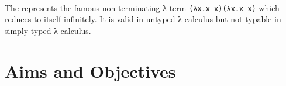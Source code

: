 \begin{code}%
\>[0]\AgdaSymbol{\{-\#}\AgdaSpace{}%
\AgdaSpace{}%
\AgdaSymbol{\#-\}}\<%
\\
\>[0]\AgdaSpace{}%
\AgdaSpace{}%
\AgdaSymbol{:}\AgdaSpace{}%
\AgdaSpace{}%
\<%
\\
\>[0][@{}l@{\AgdaIndent{0}}]%
\>[2]\AgdaSpace{}%
\AgdaSymbol{:}\AgdaSpace{}%
\AgdaSymbol{(}\AgdaSpace{}%
\AgdaSpace{}%
\AgdaSymbol{)}\AgdaSpace{}%
\AgdaSpace{}%
\<%
\\
%
\\[\AgdaEmptyExtraSkip]%
\>[0]\AgdaSpace{}%
\AgdaSymbol{:}\AgdaSpace{}%
\AgdaSpace{}%
\AgdaSpace{}%
\AgdaSpace{}%
\AgdaSpace{}%
\<%
\\
\>[0]\AgdaSpace{}%
\AgdaSymbol{(}\AgdaSpace{}%
\AgdaSymbol{)}\AgdaSpace{}%
\AgdaSpace{}%
\AgdaSymbol{=}\AgdaSpace{}%
\AgdaSpace{}%
\<%
\\
%
\\[\AgdaEmptyExtraSkip]%
\>[0]\AgdaSpace{}%
\AgdaSymbol{:}\AgdaSpace{}%
\<%
\\
\>[0]\AgdaSpace{}%
\AgdaSymbol{=}\AgdaSpace{}%
\AgdaSpace{}%
\AgdaSpace{}%
\AgdaSpace{}%
\AgdaSpace{}%
\AgdaSpace{}%
\AgdaSpace{}%
\AgdaSymbol{)}\<%
\\
%
\\[\AgdaEmptyExtraSkip]%
\>[0]\AgdaSpace{}%
\AgdaSymbol{:}\AgdaSpace{}%
\<%
\\
\>[0]\AgdaSpace{}%
\AgdaSymbol{=}\AgdaSpace{}%
\AgdaSpace{}%
\AgdaSpace{}%
\<%
\end{code}

The  represents the famous non-terminating λ-term \texttt{(λx.x x)(λx.x x)} which reduces to itself infinitely. It is valid in untyped λ-calculus but not typable in simply-typed λ-calculus. 

\section{Aims and Objectives}

